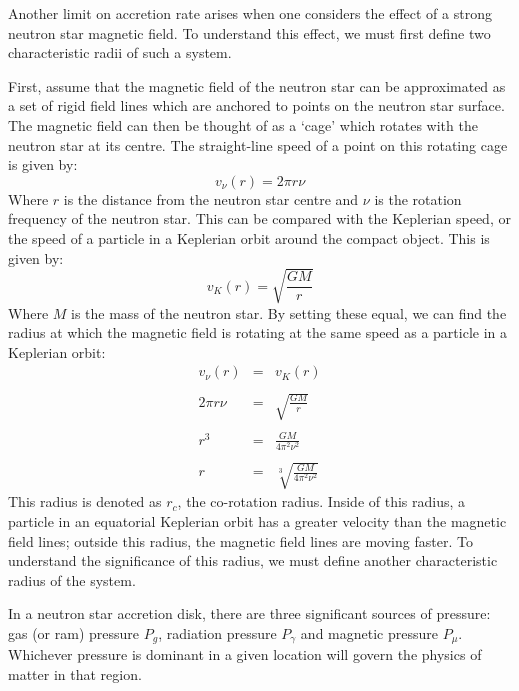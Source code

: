 \label{sec:prop}

\par{} Another limit on accretion rate arises when one considers the effect of a strong neutron star magnetic field.  To understand this effect, we must first define two characteristic radii of such a system.
\par First, assume that the magnetic field of the neutron star can be approximated as a set of rigid field lines which are anchored to points on the neutron star surface.  The magnetic field can then be thought of as a `cage' which rotates with the neutron star at its centre.  The straight-line speed of a point on this rotating cage is given by:
\begin{equation}
v_\nu(r)=2\pi r\nu
\end{equation}
Where $r$ is the distance from the neutron star centre and $\nu$ is the rotation frequency of the neutron star.  This can be compared with the Keplerian speed, or the speed of a particle in a Keplerian orbit around the compact object.  This is given by:
\begin{equation}
v_K(r)=\sqrt{\frac{GM}{r}}
\end{equation}
Where $M$ is the mass of the neutron star.  By setting these equal, we can find the radius at which the magnetic field is rotating at the same speed as a particle in a Keplerian orbit:
\begin{eqnarray}
v_\nu(r)&=&v_K(r)\\ \nonumber \\
2\pi r\nu&=&\sqrt{\frac{GM}{r}}\\ \nonumber \\
r^3&=&\frac{GM}{4\pi^2\nu^2}\\ \nonumber \\
r&=&\sqrt[3]{\frac{GM}{4\pi^2\nu^2}}
\end{eqnarray}
This radius is denoted as $r_c$, the co-rotation radius.  Inside of this radius, a particle in an equatorial Keplerian orbit has a greater velocity than the magnetic field lines; outside this radius, the magnetic field lines are moving faster.  To understand the significance of this radius, we must define another characteristic radius of the system.
\par In a neutron star accretion disk, there are three significant sources of pressure: gas (or ram) pressure $P_g$, radiation pressure $P_\gamma$ and magnetic pressure $P_\mu$.  Whichever pressure is dominant in a given location will govern the physics of matter in that region.
